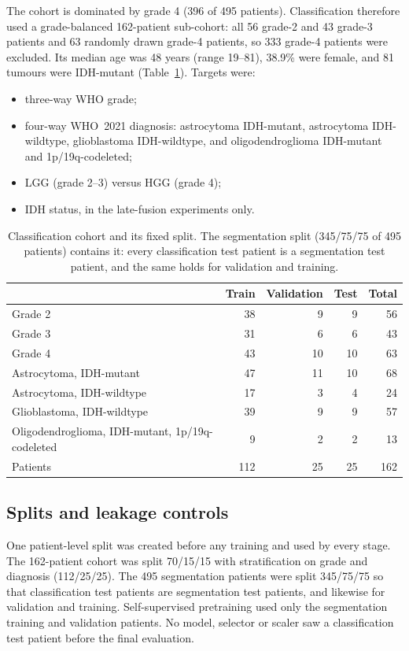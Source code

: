 \documentclass[11pt]{article}
\begin{document}
The cohort is dominated by grade 4 (396 of 495 patients). Classification therefore used a grade-balanced
162-patient sub-cohort: all 56 grade-2 and 43 grade-3 patients and 63 randomly drawn grade-4 patients, so 333 grade-4
patients were excluded. Its median age was 48 years (range 19--81), 38.9\% were female, and 81 tumours were IDH-mutant
(Table~\ref{tab:cohort}). Targets were:
\begin{itemize}
  \item three-way WHO grade;
  \item four-way WHO~2021 diagnosis: astrocytoma IDH-mutant, astrocytoma IDH-wildtype, glioblastoma IDH-wildtype, and
        oligodendroglioma IDH-mutant and 1p/19q-codeleted;
  \item LGG (grade 2--3) versus HGG (grade 4);
  \item IDH status, in the late-fusion experiments only.
\end{itemize}

\begin{table}[t]
\centering
\caption{Classification cohort and its fixed split. The segmentation split (345/75/75 of 495 patients) contains it:
every classification test patient is a segmentation test patient, and the same holds for validation and training.}
\label{tab:cohort}
\small
\begin{tabular}{lrrrr}
\toprule
 & Train & Validation & Test & Total \\
\midrule
Grade 2 & 38 & 9 & 9 & 56 \\
Grade 3 & 31 & 6 & 6 & 43 \\
Grade 4 & 43 & 10 & 10 & 63 \\
\midrule
Astrocytoma, IDH-mutant & 47 & 11 & 10 & 68 \\
Astrocytoma, IDH-wildtype & 17 & 3 & 4 & 24 \\
Glioblastoma, IDH-wildtype & 39 & 9 & 9 & 57 \\
Oligodendroglioma, IDH-mutant, 1p/19q-codeleted & 9 & 2 & 2 & 13 \\
\midrule
Patients & 112 & 25 & 25 & 162 \\
\bottomrule
\end{tabular}
\end{table}

\subsection{Splits and leakage controls}
One patient-level split was created before any training and used by every stage. The 162-patient cohort was split
70/15/15 with stratification on grade and diagnosis (112/25/25). The 495 segmentation patients were split 345/75/75
so that classification test patients are segmentation test patients, and likewise for validation and training.
Self-supervised pretraining used only the segmentation training and validation patients. No model, selector or
scaler saw a classification test patient before the final evaluation.
\end{document}
